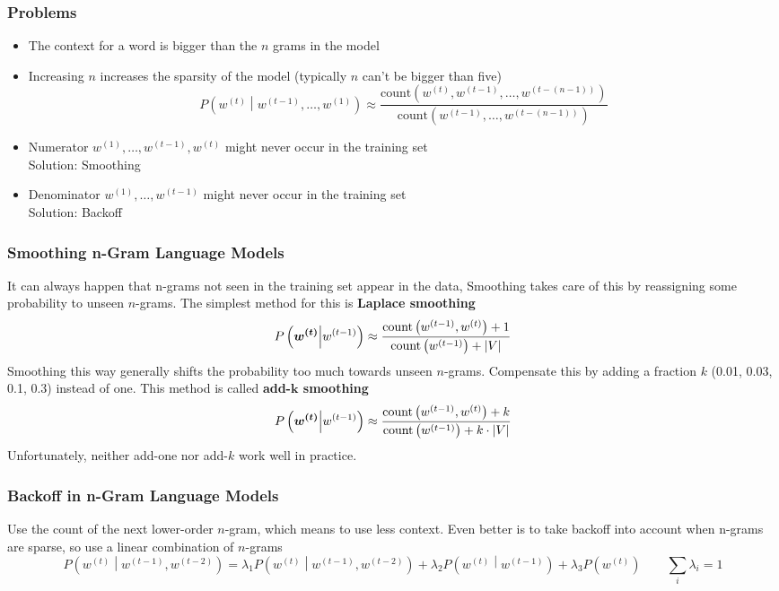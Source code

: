 \documentclass[11pt]{article}
\DeclarePairedDelimiter\abs{\lvert}{\rvert}
\begin{document}
\subsubsection{Problems}
\begin{itemize}
	\item The context for a word is bigger than the $n$ grams in the model
	\item Increasing $n$ increases the sparsity of the model (typically $n$ can't be bigger than five)
	\begin{equation*}
		P\left( w^{(t)} \middle| w^{(t-1)},\dots, w^{(1)} \right) \approx \frac{\text{count}\left(w^{(t)}, w^{(t-1)},\dots, w^{(t-(n-1))}\right)}{\text{count}\left(w^{(t-1)},\dots, w^{(t-(n-1))}\right)}
	\end{equation*}
	\item Numerator $w^{(1)},\dots, w^{(t-1)},w^{(t)}$ might never occur in the training set\\
	Solution: Smoothing
	\item Denominator $w^{(1)},\dots, w^{(t-1)}$ might never occur in the training set\\
	Solution: Backoff
\end{itemize}

\subsubsection{Smoothing n-Gram Language Models}
It can always happen that n-grams not seen in the training set appear in the data, Smoothing takes care of this by reassigning some probability to unseen $n$-grams. The simplest method for this is \textbf{Laplace smoothing}
\begin{equation*}
	P\left( \bm{w^{(t)}} \middle| w^{(t-1)} \right) \approx \frac{\text{count}\left(w^{(t-1)},w^{(t)}\right) + 1}{\text{count}\left(w^{(t-1)}\right) + \abs{V}}
\end{equation*}
Smoothing this way generally shifts the probability too much towards unseen $n$-grams. Compensate this by adding a fraction $k$ (0.01, 0.03, 0.1, 0.3) instead of one. This method is called \textbf{add-$\bm{k}$ smoothing}
\begin{equation*}
	P\left( \bm{w^{(t)}} \middle| w^{(t-1)} \right) \approx \frac{\text{count}\left(w^{(t-1)},w^{(t)}\right) + k}{\text{count}\left(w^{(t-1)}\right) + k\cdot\abs{V}}
\end{equation*}
Unfortunately, neither add-one nor add-$k$ work well in practice.

\subsubsection{Backoff in n-Gram Language Models}
Use the count of the next lower-order $n$-gram, which means to use less context. Even better is to take backoff into account when n-grams are sparse, so use a linear combination of $n$-grams
\begin{equation*}
	P\left( w^{(t)} \middle| w^{(t-1)},w^{(t-2)} \right) = \lambda_1 P\left( w^{(t)} \middle| w^{(t-1)},w^{(t-2)} \right) + \lambda_2 P\left( w^{(t)} \middle| w^{(t-1)} \right) + \lambda_3 P\left( w^{(t)} \right)\qquad \sum_{i} \lambda_i = 1
\end{equation*}
\end{document}
